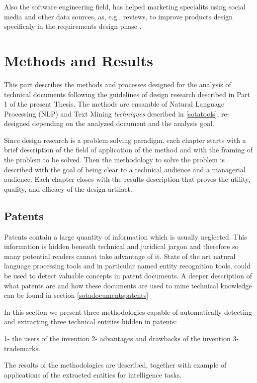 \documentclass[b5paper,]{book}
\theoremstyle{definition}
\theoremstyle{definition}
\theoremstyle{definition}
\theoremstyle{remark}
\begin{document}
Also the software engineering field, has helped marketing specialits
using social media and other data sources, as, e.g., reviews, to improve
products design specificaly in the requirements design phase
\citep{groen2017crowd}.

\part{Methods and Results}\label{part-methods-and-results}

This part describes the methods and processes designed for the analysis
of technical documents following the guidelines of design research
described in Part 1 of the present Thesis. The methods are ensamble of
Natural Language Processing (NLP) and Text Mining \emph{techniques}
described in \ref{sotatools}, re-designed depending on the analyzed
document and the analysis goal.

Since design research is a problem solving paradigm, each chapter starts
with a brief description of the field of application of the method and
with the framing of the problem to be solved. Then the methodology to
solve the problem is described with the goal of being clear to a
technical audience and a managerial audience. Each chapter closes with
the results description that proves the utility, quality, and efficacy
of the design artifact.

\chapter{Patents}\label{patents}

Patents contain a large quantity of information which is usually
neglected. This information is hidden beneath technical and juridical
jargon and therefore so many potential readers cannot take advantage of
it. State of the art natural language processing tools and in particular
named entity recognition tools, could be used to detect valuable
concepts in patent documents. A deeper description of what patents are
and how these documents are used to mine technical knowledge can be
found in section \ref{sotadocumentspatents}

In this section we present three methodologies capable of automatically
detecting and extracting three technical entities hidden in patents:

1- the users of the invention 2- advantages and drawbacks of the
invention 3- trademarks.

The results of the methodologies are described, together with example of
applications of the extracted entities for intelligence tasks.
\end{document}
